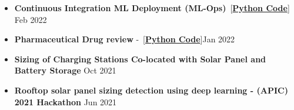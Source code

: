 \documentclass[10pt,letterpaper,sans]{moderncv} %
\begin{document}
\begin{itemize}
\begin{itemize}
		\item \textbf{Continuous Integration ML Deployment (ML-Ops)}~[\href{https://github.com/Hadi2525/ML_production_01/tree/Hadi2525-patch-1}{\textbf{Python Code}}] \hfill Feb 2022
%		
		\item \textbf{Pharmaceutical Drug review} -~[\href{https://github.com/Hadi2525/applied_ML/blob/master/Pharma/drug_model.ipynb}{\textbf{Python Code}}]\hfill Jan 2022
		\item  \textbf{Sizing of Charging Stations Co-located with Solar Panel and Battery Storage} \hfill Oct 2021
		\item \textbf{Rooftop solar panel sizing detection using deep learning -\textbf{ (APIC) 2021 Hackathon}} \hfill Jun 2021

\end{itemize}
\end{itemize}
\end{document}
